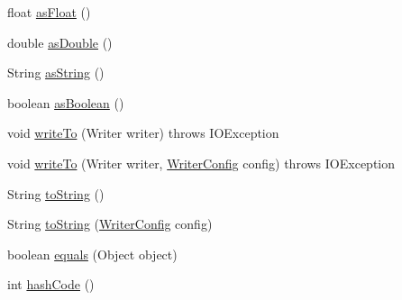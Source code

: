 \begin{DoxyCompactItemize}
\item 
float \hyperlink{classcom_1_1ingeniigroup_1_1stratux_1_1_tools_1_1_json_micro_1_1_json_value_aee2015854b8f8323a4bd7f7f770fba0e}{as\+Float} ()
\item 
double \hyperlink{classcom_1_1ingeniigroup_1_1stratux_1_1_tools_1_1_json_micro_1_1_json_value_a9907fd09f7d13a6fc574c81294672392}{as\+Double} ()
\item 
String \hyperlink{classcom_1_1ingeniigroup_1_1stratux_1_1_tools_1_1_json_micro_1_1_json_value_ab4d77d3c14dd5d92531ada3833717335}{as\+String} ()
\item 
boolean \hyperlink{classcom_1_1ingeniigroup_1_1stratux_1_1_tools_1_1_json_micro_1_1_json_value_ad3b9b6972e0be22222138129f26d1d3d}{as\+Boolean} ()
\item 
void \hyperlink{classcom_1_1ingeniigroup_1_1stratux_1_1_tools_1_1_json_micro_1_1_json_value_a41c84cc48d6f44b0c75130f3a1476704}{write\+To} (Writer writer)  throws I\+O\+Exception 
\item 
void \hyperlink{classcom_1_1ingeniigroup_1_1stratux_1_1_tools_1_1_json_micro_1_1_json_value_a9293ecb42f9bf14d6c5df006685df49e}{write\+To} (Writer writer, \hyperlink{classcom_1_1ingeniigroup_1_1stratux_1_1_tools_1_1_json_micro_1_1_writer_config}{Writer\+Config} config)  throws I\+O\+Exception 
\item 
String \hyperlink{classcom_1_1ingeniigroup_1_1stratux_1_1_tools_1_1_json_micro_1_1_json_value_a4a4c7c52f20eb175c506580b1d1ccb3e}{to\+String} ()
\item 
String \hyperlink{classcom_1_1ingeniigroup_1_1stratux_1_1_tools_1_1_json_micro_1_1_json_value_af2572445c4b1f430355ba41be454754b}{to\+String} (\hyperlink{classcom_1_1ingeniigroup_1_1stratux_1_1_tools_1_1_json_micro_1_1_writer_config}{Writer\+Config} config)
\item 
boolean \hyperlink{classcom_1_1ingeniigroup_1_1stratux_1_1_tools_1_1_json_micro_1_1_json_value_a3296df6eea6d3ed3841c3b208ecfa415}{equals} (Object object)
\item 
int \hyperlink{classcom_1_1ingeniigroup_1_1stratux_1_1_tools_1_1_json_micro_1_1_json_value_a7124cd0c666113946882f8718b802813}{hash\+Code} ()
\end{DoxyCompactItemize}
